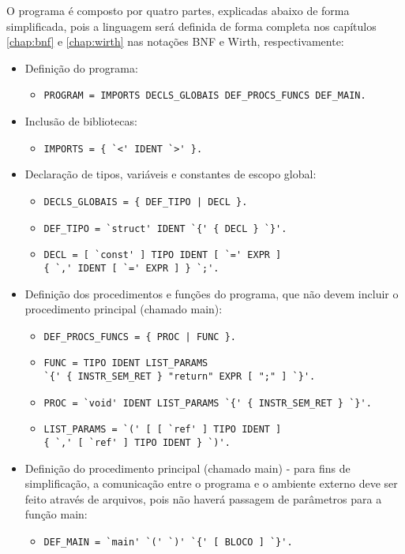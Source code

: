 
O programa é composto por quatro partes, explicadas abaixo de forma simplificada, pois a linguagem será definida de forma completa nos capítulos \ref{chap:bnf} e \ref{chap:wirth} nas notações BNF e Wirth, respectivamente:

\begin{itemize}
	\item Definição do programa:
		\begin{itemize}
			\item \verb$PROGRAM = IMPORTS DECLS_GLOBAIS DEF_PROCS_FUNCS DEF_MAIN.$
		\end{itemize}
	\item Inclusão de bibliotecas:
		\begin{itemize}
			\item \verb$IMPORTS = { `<' IDENT `>' }.$
		\end{itemize}
	\item Declaração de tipos, variáveis e constantes de escopo global:
		\begin{itemize}
			\item \verb$DECLS_GLOBAIS = { DEF_TIPO | DECL }.$
			\item \verb$DEF_TIPO = `struct' IDENT `{' { DECL } `}'.$
			\item \verb$DECL = [ `const' ] TIPO IDENT [ `=' EXPR ]$\\
				\verb${ `,' IDENT [ `=' EXPR ] } `;'.$
		\end{itemize}
	\item Definição dos procedimentos e funções do programa, que não devem incluir o procedimento principal (chamado main):
		\begin{itemize}
			\item \verb$DEF_PROCS_FUNCS = { PROC | FUNC }.$
			\item \verb$FUNC = TIPO IDENT LIST_PARAMS$\\
				\verb$`{' { INSTR_SEM_RET } "return" EXPR [ ";" ] `}'.$
			\item \verb$PROC = `void' IDENT LIST_PARAMS `{' { INSTR_SEM_RET } `}'.$
			\item \verb$LIST_PARAMS = `(' [ [ `ref' ] TIPO IDENT ]$\\
				\verb${ `,' [ `ref' ] TIPO IDENT } `)'.$
		\end{itemize}
	\item Definição do procedimento principal (chamado main) - para fins de simplificação, a comunicação entre o programa e o ambiente externo deve ser feito através de arquivos, pois não haverá passagem de parâmetros para a função main:
		\begin{itemize}
			\item \verb$DEF_MAIN = `main' `(' `)' `{' [ BLOCO ] `}'.$
		\end{itemize}
\end{itemize}
